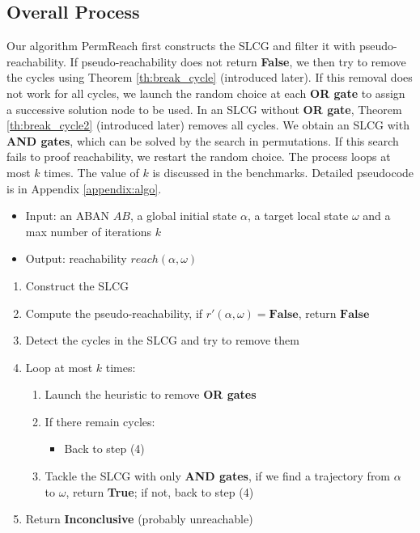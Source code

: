\documentclass[runningheads]{llncs}
\begin{document}
\subsection{Overall Process}\label{sectOverall}
Our algorithm PermReach first constructs the SLCG and filter it with pseudo-reachability. 
If pseudo-reachability does not return \textbf{False}, we then try to remove the cycles using Theorem \ref{th:break_cycle} (introduced later).
If this removal does not work for all cycles, we launch the random choice at each \textbf{OR gate} to assign a successive solution node to be used.
In an SLCG without \textbf{OR gate}, Theorem \ref{th:break_cycle2} (introduced later) removes all cycles.
We obtain an SLCG with \textbf{AND gates}, which can be solved by the search in permutations.
If this search fails to proof reachability, we restart the random choice.
The process loops at most $k$ times.
The value of $k$ is discussed in the benchmarks.
Detailed pseudocode is in Appendix \ref{appendix:algo}.
\begin{itemize}
    \item Input: an ABAN $AB$, a global initial state $\alpha$, a target local state $\omega$ and a max number of iterations $k$
    \item Output: reachability $reach(\alpha, \omega)$
\end{itemize}
\begin{enumerate}
\item Construct the SLCG
\item Compute the pseudo-reachability, if $r'(\alpha,\omega)=\mathbf{False}$, return $\mathbf{False}$
\item Detect the cycles in the SLCG and try to remove them 
\item Loop at most $k$ times:
\begin{enumerate}
    \item Launch the heuristic to remove \textbf{OR gates} 
    \item If there remain cycles:
    \begin{itemize}
        \item Back to step (4)
    \end{itemize}
    \item Tackle the SLCG with only \textbf{AND gates}, if we find a trajectory from $\alpha$ to $\omega$, return \textbf{True}; if not, back to step (4)
\end{enumerate}
\item Return \textbf{Inconclusive} (probably unreachable)
\end{enumerate}
\end{document}
